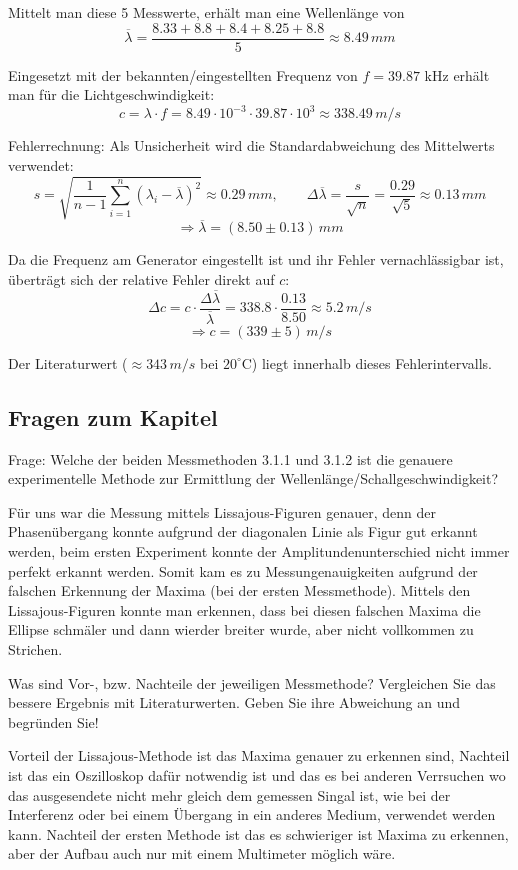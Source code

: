 \documentclass[
  headings=optiontotocandhead,
  twoside,
  openright,
  numbers=noenddot,
  toc=flat,
  11pt,
  parskip=full,
  listof=flat,
  bibliography=totoc,
  a4paper,
  DIV=14,
  BCOR=22mm,
  headheight=5mm,
  headinclude=true,
]{scrartcl}
\begin{document}
Mittelt man diese 5 Messwerte, erhält man eine Wellenlänge von
$$ \overline{\lambda} = \frac{8.33 + 8.8 + 8.4 + 8.25 + 8.8}{5} \approx 8.49 \,mm $$

Eingesetzt mit der bekannten/eingestellten Frequenz von $f = 39.87$ kHz erhält man für die Lichtgeschwindigkeit:
$$ c = \lambda \cdot f = 8.49 \cdot 10^{-3} \cdot 39.87 \cdot 10^3 \approx 338.49\, m/s $$ 

Fehlerrechnung: Als Unsicherheit wird die Standardabweichung des Mittelwerts verwendet:
$$ s = \sqrt{\frac{1}{n-1}\sum_{i=1}^{n}(\lambda_i - \overline{\lambda})^2} \approx 0.29\,mm, \qquad
   \Delta\overline{\lambda} = \frac{s}{\sqrt{n}} = \frac{0.29}{\sqrt{5}} \approx 0.13\,mm $$
$$ \Rightarrow \overline{\lambda} = (8.50 \pm 0.13)\,mm $$

Da die Frequenz am Generator eingestellt ist und ihr Fehler vernachlässigbar ist, überträgt sich der
relative Fehler direkt auf $c$:
$$ \Delta c = c \cdot \frac{\Delta\overline{\lambda}}{\overline{\lambda}} = 338.8 \cdot \frac{0.13}{8.50} \approx 5.2\,m/s $$
$$ \Rightarrow c = (339 \pm 5)\,m/s $$

Der Literaturwert ($\approx 343\,m/s$ bei $20^\circ$C) liegt innerhalb dieses Fehlerintervalls.

\subsection{Fragen zum Kapitel}

Frage: Welche der beiden Messmethoden 3.1.1 und 3.1.2 ist die genauere experimentelle Methode zur
Ermittlung der Wellenlänge/Schallgeschwindigkeit?

Für uns war die Messung mittels Lissajous-Figuren genauer, denn der Phasenübergang konnte aufgrund der diagonalen Linie als Figur gut erkannt werden, beim ersten Experiment konnte der Amplitundenunterschied nicht immer perfekt erkannt werden. Somit kam es zu Messungenauigkeiten aufgrund der falschen Erkennung der Maxima (bei der ersten Messmethode). Mittels den Lissajous-Figuren konnte man erkennen, dass bei diesen falschen Maxima die Ellipse schmäler und dann wierder breiter wurde, aber nicht vollkommen zu Strichen.

Was sind Vor-, bzw. Nachteile der jeweiligen Messmethode? Vergleichen Sie das bessere Ergebnis mit
Literaturwerten. Geben Sie ihre Abweichung an und begründen Sie!

Vorteil der Lissajous-Methode ist das Maxima genauer zu erkennen sind, Nachteil ist das ein Oszilloskop dafür notwendig ist und das es bei anderen Verrsuchen wo das ausgesendete nicht mehr gleich dem gemessen Singal ist, wie bei der Interferenz oder bei einem Übergang in ein anderes Medium, verwendet werden kann. Nachteil der ersten Methode ist das es schwieriger ist Maxima zu erkennen, aber der Aufbau auch nur mit einem Multimeter möglich wäre.
\end{document}
